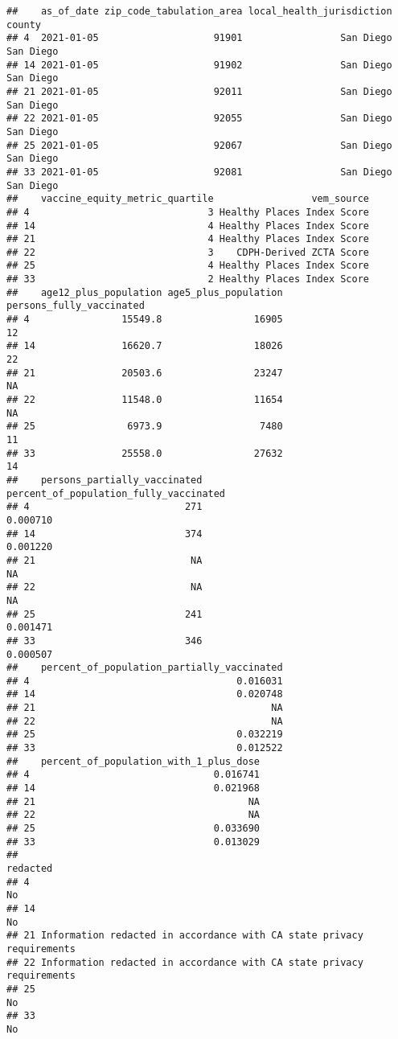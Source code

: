 \documentclass[
]{article}
\begin{document}
\begin{verbatim}
##    as_of_date zip_code_tabulation_area local_health_jurisdiction    county
## 4  2021-01-05                    91901                 San Diego San Diego
## 14 2021-01-05                    91902                 San Diego San Diego
## 21 2021-01-05                    92011                 San Diego San Diego
## 22 2021-01-05                    92055                 San Diego San Diego
## 25 2021-01-05                    92067                 San Diego San Diego
## 33 2021-01-05                    92081                 San Diego San Diego
##    vaccine_equity_metric_quartile                 vem_source
## 4                               3 Healthy Places Index Score
## 14                              4 Healthy Places Index Score
## 21                              4 Healthy Places Index Score
## 22                              3    CDPH-Derived ZCTA Score
## 25                              4 Healthy Places Index Score
## 33                              2 Healthy Places Index Score
##    age12_plus_population age5_plus_population persons_fully_vaccinated
## 4                15549.8                16905                       12
## 14               16620.7                18026                       22
## 21               20503.6                23247                       NA
## 22               11548.0                11654                       NA
## 25                6973.9                 7480                       11
## 33               25558.0                27632                       14
##    persons_partially_vaccinated percent_of_population_fully_vaccinated
## 4                           271                               0.000710
## 14                          374                               0.001220
## 21                           NA                                     NA
## 22                           NA                                     NA
## 25                          241                               0.001471
## 33                          346                               0.000507
##    percent_of_population_partially_vaccinated
## 4                                    0.016031
## 14                                   0.020748
## 21                                         NA
## 22                                         NA
## 25                                   0.032219
## 33                                   0.012522
##    percent_of_population_with_1_plus_dose
## 4                                0.016741
## 14                               0.021968
## 21                                     NA
## 22                                     NA
## 25                               0.033690
## 33                               0.013029
##                                                                 redacted
## 4                                                                     No
## 14                                                                    No
## 21 Information redacted in accordance with CA state privacy requirements
## 22 Information redacted in accordance with CA state privacy requirements
## 25                                                                    No
## 33                                                                    No
\end{verbatim}
\end{document}
